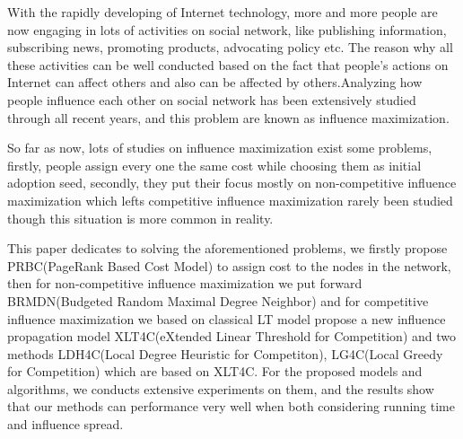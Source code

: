 \begin{eabstract} 
With the rapidly developing of Internet technology, more and more people are now engaging in lots of activities on social network, like publishing information, subscribing news, promoting products, advocating policy etc. The reason why all these activities can be well conducted based on the fact that people's actions on Internet can affect others and also can be affected by others.Analyzing how people influence each other on social network has been extensively studied through all recent years, and this problem are known as influence maximization.


So far as now, lots of studies on influence maximization exist some problems, firstly, people assign every one the same cost while choosing them as initial adoption seed, secondly, they put their focus mostly on non-competitive influence maximization which lefts competitive influence maximization rarely been studied though this situation is more common in reality.


This paper dedicates to solving the aforementioned problems, we firstly propose PRBC(PageRank Based Cost Model) to assign cost to the nodes in the network, then for non-competitive influence maximization we put forward BRMDN(Budgeted Random Maximal Degree Neighbor) and for competitive influence maximization we based on classical LT model propose a new influence propagation model XLT4C(eXtended Linear Threshold for Competition) and two methods LDH4C(Local Degree Heuristic for Competiton), LG4C(Local Greedy for Competition) which are based on XLT4C. For the proposed models and algorithms, we conducts extensive experiments on them, and the results show that our methods can performance very well when both considering running time and influence spread.


\end{eabstract}